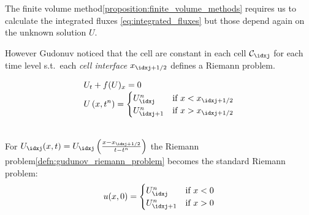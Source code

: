 \begin{sectionbox}[Problem]\nospacing
    The finite volume method\cref{proposition:finite_volume_methods} requires us to calculate the integrated fluxes \cref{eq:integrated_fluxes}
    but those depend again on the unknown solution $U$.\\
    \begin{minipage}{0.45\textwidth}
      However Gudonuv noticed that the cell  are constant in each cell $\mathcal{C}_{\idxj}$ for each time level s.t.\ each \textit{cell interface}
      $x_{\idxj+1/2}$ defines a Riemann problem.
    \end{minipage}\hfill
    \begin{minipage}[c]{0.5\textwidth}
        \begin{figure}[H]
            \centering{
              \def\svgwidth{120pt}
              \resizebox{\linewidth}{!}{}
            }
        \end{figure}
    \end{minipage}
\end{sectionbox}
\begin{defnbox}\nospacing
    \begin{defn}\label{defn:gudunov_riemann_problem}
        \begin{align}
          &U_{t}+f(U)_{x}=0 \\[-1\jot]
          &U\left(x,t^{n}\right)=
          \begin{cases}
              U_{\idxj}^{n}&\text{if }x<x_{\idxj+1/2}\\
              U_{\idxj+1}^{n}&\text{if }x>x_{\idxj+1/2}\\
          \end{cases}\label{eq:gudunov_riemann_problem}
        \end{align}
    \end{defn}
\end{defnbox}
\begin{corbox}\nospacing
    \begin{cor}\label{cor:scaled_gudunov_riemann_problem}\leavevmode\\
        For $U_{\idxj}(x,t)=U_{\idxj}\left(\frac{x-x_{\idxj+1/2}}{t-t^{n}}\right)$ the Riemann problem\cref{defn:gudunov_riemann_problem} becomes the standard Riemann problem:
        \begin{align}
            u(x,0)=\begin{cases}
                    U_{\idxj}^{n}&\text{if }x<0\\
                    U_{\idxj+1}^{n}&\text{if }x>0
                    \end{cases}
        \label{eq:riemann_problem_gudunov}
        \end{align}
    \end{cor}
\end{corbox}
